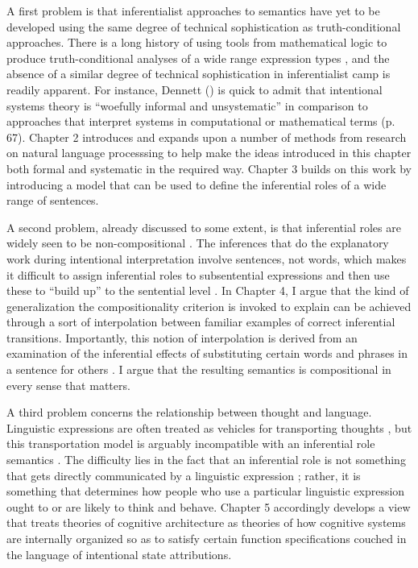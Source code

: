 A first problem is that inferentialist approaches to semantics have yet to be developed using the same degree of technical sophistication as truth-conditional approaches. There is a long history of using tools from mathematical logic to produce truth-conditional analyses of a wide range expression types \citep[e.g.,][]{Carpenter:1997}, and the absence of a similar degree of technical sophistication in inferentialist camp is readily apparent. For instance, Dennett (\citeyear{Dennett:1987}) is quick to admit that intentional systems theory is ``woefully informal and unsystematic'' in comparison to approaches that interpret systems in computational or mathematical terms (p. 67). Chapter 2 introduces and expands upon a number of methods from research on natural language processsing to help make the ideas introduced in this chapter both formal and systematic in the required way. Chapter 3 builds on this work by introducing a model that can be used to define the inferential roles of a wide range of sentences. 

A second problem, already discussed to some extent, is that inferential roles are widely seen to be non-compositional \citep{FodorLepore:2002,Fodor:1998,MargolisLaurence:1999}. The inferences that do the explanatory work during intentional interpretation involve sentences, not words, which makes it difficult to assign inferential roles to subsentential expressions and then use these to ``build up'' to the sentential level \citep{Brandom:1994}. In Chapter 4, I argue that the kind of generalization the compositionality criterion is invoked to explain can be achieved through a sort of interpolation between familiar examples of correct inferential transitions. Importantly, this notion of interpolation is derived from an examination of the inferential effects of substituting certain words and phrases in a sentence for others \citep{Brandom:1994}. I argue that the resulting semantics is compositional in every sense that matters.

A third problem concerns the relationship between thought and language. Linguistic expressions are often treated as vehicles for transporting thoughts \citep{Brandom:1994,KortaPerry:2015,Fodor:1998}, but this transportation model is arguably incompatible with an inferential role semantics \citep{Brandom:2010,Brandom:1994}. The difficulty lies in the fact that an inferential role is not something that gets directly communicated by a linguistic expression \citep{Brandom:2010,Brandom:1994}; rather, it is something that determines how people who use a particular linguistic expression ought to or are likely to think and behave. Chapter 5 accordingly develops a view that treats theories of cognitive architecture as theories of how cognitive systems are internally organized so as to satisfy certain function specifications couched in the language of intentional state attributions. 

